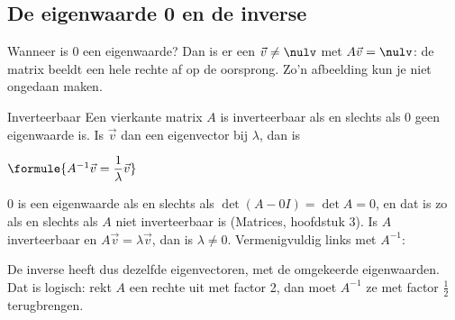 \begin{oefeningen}
\end{oefeningen}

\subsection{De eigenwaarde 0 en de inverse}

Wanneer is 0 een eigenwaarde? Dan is er een $\vec v \neq \nulv$ met $A\vec v = \nulv$: de matrix beeldt een hele rechte af op de oorsprong. Zo'n afbeelding kun je niet ongedaan maken.

\begin{theorie}
\begin{stelling}{Inverteerbaar}
Een vierkante matrix $A$ is inverteerbaar als en slechts als 0 geen eigenwaarde is. Is $\vec v$ dan een eigenvector bij $\lambda$, dan is

\vspace{1mm}
\qquad $\formule{A^{-1}\vec v = \dfrac{1}{\lambda}\vec v}$
\end{stelling}

\begin{bewijs}
0 is een eigenwaarde als en slechts als $\det(A - 0I) = \det A = 0$, en dat is zo als en slechts als $A$ niet inverteerbaar is (Matrices, hoofdstuk 3). Is $A$ inverteerbaar en $A\vec v = \lambda\vec v$, dan is $\lambda \neq 0$. Vermenigvuldig links met $A^{-1}$:
\end{bewijs}
\end{theorie}

De inverse heeft dus dezelfde eigenvectoren, met de omgekeerde eigenwaarden. Dat is logisch: rekt $A$ een rechte uit met factor 2, dan moet $A^{-1}$ ze met factor $\tfrac12$ terugbrengen.


